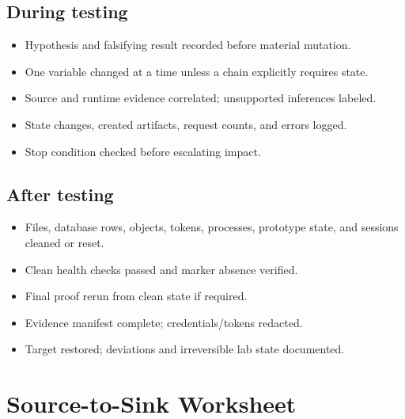 \documentclass[11pt]{article}
\begin{document}
\subsection*{During testing}
\begin{itemize}[label=$\square$]
  \item Hypothesis and falsifying result recorded before material mutation.
  \item One variable changed at a time unless a chain explicitly requires state.
  \item Source and runtime evidence correlated; unsupported inferences labeled.
  \item State changes, created artifacts, request counts, and errors logged.
  \item Stop condition checked before escalating impact.
\end{itemize}

\subsection*{After testing}
\begin{itemize}[label=$\square$]
  \item Files, database rows, objects, tokens, processes, prototype state, and sessions cleaned or reset.
  \item Clean health checks passed and marker absence verified.
  \item Final proof rerun from clean state if required.
  \item Evidence manifest complete; credentials/tokens redacted.
  \item Target restored; deviations and irreversible lab state documented.
\end{itemize}

\section{Source-to-Sink Worksheet}
\end{document}
